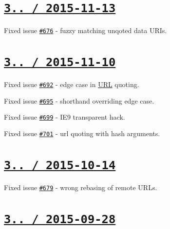 \section*{\href{https://github.com/jakubpawlowicz/clean-css/compare/v3.4.7...v3.4.8}{\tt 3.. / 2015-\/11-\/13} }


\begin{DoxyItemize}
\item Fixed issue \href{https://github.com/jakubpawlowicz/clean-css/issues/676}{\tt \#676} -\/ fuzzy matching unqoted data U\+R\+Is.
\end{DoxyItemize}

\section*{\href{https://github.com/jakubpawlowicz/clean-css/compare/v3.4.6...v3.4.7}{\tt 3.. / 2015-\/11-\/10} }


\begin{DoxyItemize}
\item Fixed issue \href{https://github.com/jakubpawlowicz/clean-css/issues/692}{\tt \#692} -\/ edge case in \mbox{\hyperlink{namespace_u_r_l}{U\+RL}} quoting.
\item Fixed issue \href{https://github.com/jakubpawlowicz/clean-css/issues/695}{\tt \#695} -\/ shorthand overriding edge case.
\item Fixed issue \href{https://github.com/jakubpawlowicz/clean-css/issues/699}{\tt \#699} -\/ I\+E9 transparent hack.
\item Fixed issue \href{https://github.com/jakubpawlowicz/clean-css/issues/701}{\tt \#701} -\/ {\ttfamily url} quoting with hash arguments.
\end{DoxyItemize}

\section*{\href{https://github.com/jakubpawlowicz/clean-css/compare/v3.4.5...v3.4.6}{\tt 3.. / 2015-\/10-\/14} }


\begin{DoxyItemize}
\item Fixed issue \href{https://github.com/jakubpawlowicz/clean-css/issues/679}{\tt \#679} -\/ wrong rebasing of remote U\+R\+Ls.
\end{DoxyItemize}

\section*{\href{https://github.com/jakubpawlowicz/clean-css/compare/v3.4.4...v3.4.5}{\tt 3.. / 2015-\/09-\/28} }


